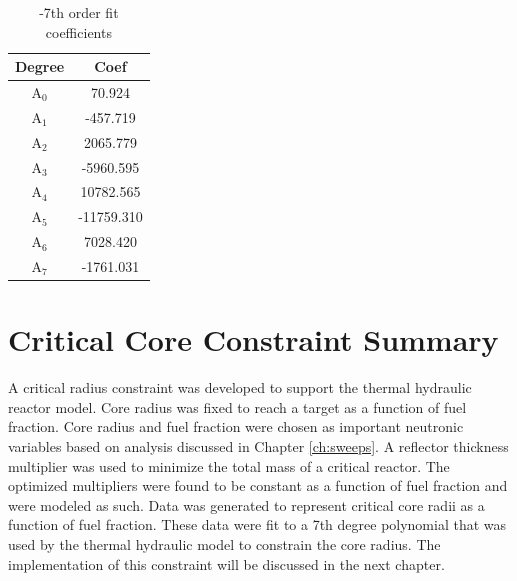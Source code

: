 \begin{table}[h]
  \centering
  \caption{\uox-\codiox 7th order fit coefficients}
  \begin{tabular}{cc}
    \toprule
     Degree & Coef\\ 
    \midrule                                  
    A$_0$  &  70.924\\
    A$_1$  &  -457.719\\
    A$_2$  &  2065.779\\
    A$_3$  &  -5960.595\\
    A$_4$  &  10782.565\\
    A$_5$  &  -11759.310\\
    A$_6$  &  7028.420\\
    A$_7$  &  -1761.031\\
  \end{tabular}
  \label{tab:uo2_co2_fit_coeffs}
\end{table}

\section{Critical Core Constraint Summary}
A critical radius constraint was developed to support the thermal hydraulic
reactor model. Core radius was fixed to reach a target \keff as a function of
fuel fraction. Core radius and fuel fraction were chosen as important neutronic
variables based on analysis discussed in Chapter \ref{ch:sweeps}. A reflector
thickness multiplier was used to minimize the total mass of a critical reactor.
The optimized multipliers were found to be constant as a function of fuel
fraction and were modeled as such. Data was generated to represent critical core
radii as a function of fuel fraction. These data were fit to a 7th
degree polynomial that was used by the thermal hydraulic model to constrain the
core radius. The implementation of this constraint will be discussed in the next
chapter.
